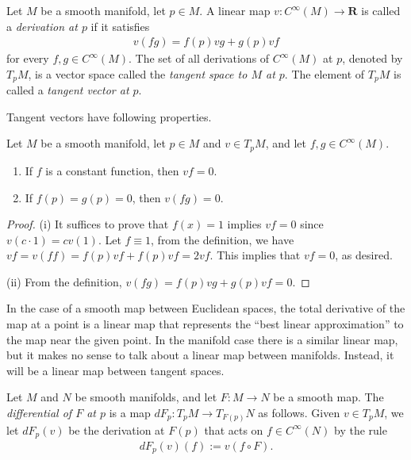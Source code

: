 \begin{definition}
    Let $M$ be a smooth manifold, let $p \in M$. A linear map $v : C^\infty(M) \to \mathbf{R}$  is called a \emph{derivation at $p$} if it satisfies
    \begin{align*}
        v(fg) = f(p)vg + g(p)vf
    \end{align*}
for every $f,g \in C^\infty(M)$. The set of all derivations of $C^\infty(M)$ at $p$, denoted by $T_pM$, is a vector space called the \emph{tangent space to $M$ at $p$}. The element of $T_pM$ is called a \emph{tangent vector at $p$}.
\end{definition}

Tangent vectors have following properties.

\begin{lemma}
    Let $M$ be a smooth manifold, let $p \in M$ and $v \in T_pM$, and let $f, g \in C^\infty(M)$.
    \begin{enumerate}
        \item If $f$ is a constant function, then $vf = 0$.
        \item If $f(p) = g(p) = 0$, then $v(fg) = 0$.
    \end{enumerate}
\end{lemma}

\begin{proof}
    (i) It suffices to prove that $f(x) = 1$ implies $vf = 0$ since $v(c \cdot 1) = cv(1)$. Let $f \equiv 1$, from the definition, we have $vf = v(ff) = f(p)vf + f(p)vf = 2vf$. This implies that $vf = 0$, as desired.

    (ii) From the definition, $v(fg) = f(p)vg + g(p)vf = 0$.
\end{proof}

In the case of a smooth map between Euclidean spaces, the total derivative of the map at a point is a linear map that represents the ``best linear approximation'' to the map near the given point. In the manifold case there is a similar linear map, but it makes no sense to talk about a linear map between manifolds. Instead, it will be a linear map between tangent spaces.

\begin{definition}[Differential]
    Let $M$ and $N$ be smooth manifolds, and let $F : M \to N$ be a smooth map. The \emph{differential of $F$ at $p$} is a map $dF_p : T_pM \to T_{F(p)}N$ as follows. Given $v \in T_pM$, we let $dF_p(v)$ be the derivation at $F(p)$ that acts on $f \in C^\infty(N)$ by the rule
    \begin{align*}
        dF_p(v)(f) := v(f \circ F).
    \end{align*}
\end{definition}


